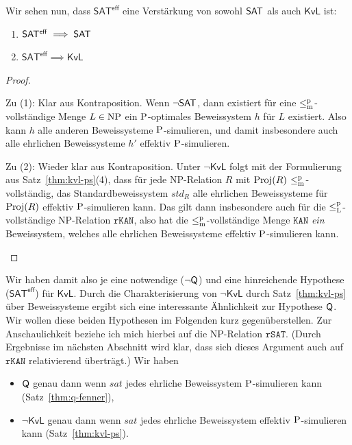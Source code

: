 Wir sehen nun, dass $\mathsf{SAT^{eff}}$ eine Verstärkung von sowohl $\hSAT$ als auch $\mathsf{KvL}$ ist:
\begin{corollary}\label{cor:sateff-generalizes-sat}
    \begin{enumerate}
        \item $\mathsf{SAT^{eff}}\implies \hSAT$
        \item $\mathsf{SAT^{eff}}\implies \mathsf{KvL}$
    \end{enumerate}
\end{corollary}
\begin{proof}
\begin{prooflist}
\item Zu (1): Klar aus Kontraposition. Wenn $\neg\hSAT$, dann existiert für eine $\leqmp$-vollständige Menge $L\in\NP$ ein $\P$-optimales Beweissystem $h$ für $L$ existiert. Also kann $h$ alle anderen Beweissysteme $\P$-simulieren, und damit insbesondere auch alle ehrlichen Beweissysteme $h'$ effektiv $\P$-simulieren.

\item Zu (2): Wieder klar aus Kontraposition. Unter $\neg\mathsf{KvL}$ folgt mit der Formulierung aus Satz~\ref{thm:kvl-ps}(4), dass für jede NP-Relation $R$ mit $\Proj(R)$ $\leqmp$-vollständig, das Standardbeweissystem $\mathit{std}_R$ alle ehrlichen Beweissysteme für $\Proj(R)$ effektiv $\P$-simulieren kann. Das gilt dann insbesondere auch für die $\leqlp$-vollständige NP-Relation $\mathtt{rKAN}$, also hat die $\leqmp$-vollständige Menge $\mathtt{KAN}$ \emph{ein} Beweissystem, welches alle ehrlichen Beweissysteme effektiv $\P$-simulieren kann.
\end{prooflist}
\end{proof}

Wir haben damit also je eine notwendige ($\neg\hQ$) und eine hinreichende Hypothese ($\mathsf{SAT^{eff}}$) für $\mathsf{KvL}$. Durch die Charakterisierung von $\neg\mathsf{KvL}$ durch Satz~\ref{thm:kvl-ps} über Beweissysteme ergibt sich eine interessante Ähnlichkeit zur Hypothese $\hQ$. Wir wollen diese beiden Hypothesen im Folgenden kurz gegenüberstellen.
Zur Anschaulichkeit beziehe ich mich hierbei auf die NP-Relation $\mathtt{rSAT}$. (Durch Ergebnisse im nächsten Abschnitt wird klar, dass sich dieses Argument auch auf $\mathtt{rKAN}$ relativierend überträgt.)
Wir haben
\begin{itemize}
    \item $\hQ$ genau dann wenn $\mathit{sat}$ jedes ehrliche Beweissystem $\P$-simulieren kann (Satz~\ref{thm:q-fenner}),
    \item $\neg\mathsf{KvL}$ genau dann wenn $\mathit{sat}$ jedes ehrliche Beweissystem effektiv $\P$-simulieren kann (Satz~\ref{thm:kvl-ps}).
\end{itemize}

